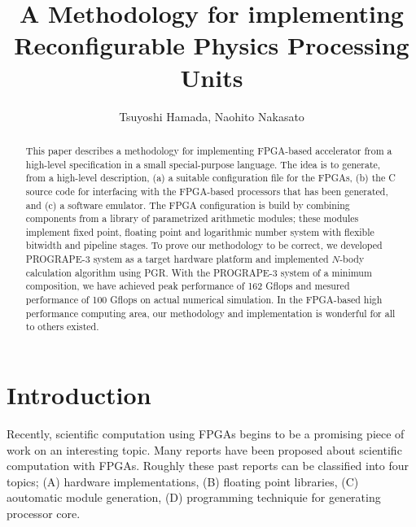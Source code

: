 \documentclass{llncs}
\begin{document}
\def\addtocontents#1#2{}%
\def\addcontentsline#1#2#3{}%
\def\markboth#1#2{}%
%
\title {A Methodology for implementing Reconfigurable Physics Processing Units}

\author{Tsuyoshi Hamada, Naohito Nakasato}


\maketitle
%
\begin{abstract}
This paper describes a methodology for implementing FPGA-based
accelerator from a high-level specification in a small special-purpose
language.  The idea is to generate, from a high-level description, (a)
a suitable configuration file for the FPGAs, (b) the C source code for
interfacing with the FPGA-based processors that has been generated,
and (c) a software emulator. The FPGA configuration is build by
combining components from a library of parametrized arithmetic
modules; these modules implement fixed point, floating point and
logarithmic number system with flexible bitwidth and pipeline stages. To
prove our methodology to be correct, we developed PROGRAPE-3 system as
a target hardware platform and implemented $N$-body calculation
algorithm using PGR.  With the PROGRAPE-3 system of a minimum
composition, we have achieved peak performance of 162 Gflops and
mesured performance of 100 Gflops on actual numerical simulation.
In the FPGA-based high performance computing area,
our methodology and implementation is wonderful for all to others existed.
\end{abstract}
%
\section{Introduction}
%

Recently, scientific computation using FPGAs begins to be a promising
piece of work on an interesting topic. Many reports have been
proposed about scientific computation with FPGAs. Roughly these past
reports can be classified into four topics; (A) hardware
implementations, (B) floating point libraries, (C) aoutomatic module
generation, (D) programming techniquie for generating processor core.
\end{document}
